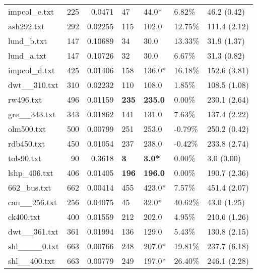 \begin{table}[h]
\begin{tabular}{lrrllll}
 impcol_e.txt       &     225 &     0.0471  & 47           & 44.0*           & 6.82\%   & 46.2 (0.42)    \\
 ash292.txt         &     292 &     0.02255 & 115          & 102.0           & 12.75\%  & 111.4 (2.12)   \\
 lund_b.txt         &     147 &     0.10689 & 34           & 30.0            & 13.33\%  & 31.9 (1.37)    \\
 lund_a.txt         &     147 &     0.10726 & 32           & 30.0            & 6.67\%   & 31.3 (0.82)    \\
 impcol_d.txt       &     425 &     0.01406 & 158          & 136.0*          & 16.18\%  & 152.6 (3.81)   \\
 dwt__310.txt       &     310 &     0.02232 & 110          & 108.0           & 1.85\%   & 108.5 (1.08)   \\
 rw496.txt          &     496 &     0.01159 & \textbf{235} & \textbf{235.0}  & 0.00\%   & 230.1 (2.64)   \\
 gre__343.txt       &     343 &     0.01862 & 141          & 131.0           & 7.63\%   & 137.4 (2.22)   \\
 olm500.txt         &     500 &     0.00799 & 251          & 253.0           & -0.79\%  & 250.2 (0.42)   \\
 rdb450.txt         &     450 &     0.01054 & 237          & 238.0           & -0.42\%  & 233.8 (2.74)   \\
 tols90.txt         &      90 &     0.3618  & \textbf{3}   & \textbf{3.0*}   & 0.00\%   & 3.0 (0.00)     \\
 lshp_406.txt       &     406 &     0.01405 & \textbf{196} & \textbf{196.0}  & 0.00\%   & 190.7 (2.36)   \\
 662_bus.txt        &     662 &     0.00414 & 455          & 423.0*          & 7.57\%   & 451.4 (2.07)   \\
 can__256.txt       &     256 &     0.04075 & 45           & 32.0*           & 40.62\%  & 43.0 (1.25)    \\
 ck400.txt          &     400 &     0.01559 & 212          & 202.0           & 4.95\%   & 210.6 (1.26)   \\
 dwt__361.txt       &     361 &     0.01994 & 136          & 129.0           & 5.43\%   & 130.8 (2.15)   \\
 shl____0.txt       &     663 &     0.00766 & 248          & 207.0*          & 19.81\%  & 237.7 (6.18)   \\
 shl__400.txt       &     663 &     0.00779 & 249          & 197.0*          & 26.40\%  & 246.1 (2.28)   \\

\end{tabular}
\end{table}
